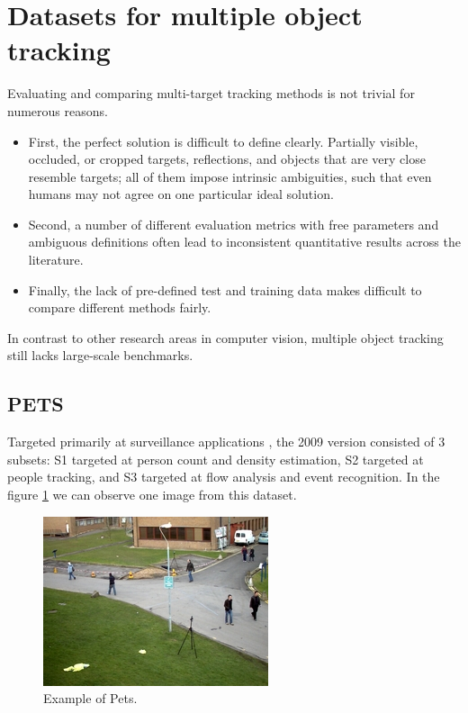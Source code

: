 \section{Datasets for multiple object tracking}\label{datasetracks}

Evaluating and comparing multi-target tracking methods is not trivial for numerous reasons. 

\begin{itemize}

\item First, the perfect solution is difficult to define clearly. Partially visible, occluded, or cropped targets, reflections, and objects that are very close resemble targets; all of them impose intrinsic ambiguities, such that even humans may not agree on one particular ideal solution.

\item Second, a number of different evaluation metrics with free parameters and ambiguous definitions often lead to inconsistent quantitative results across the literature.

\item Finally, the lack of pre-defined test and training data makes difficult to compare different methods fairly.

\end{itemize}


In contrast to other research areas in computer vision, multiple object tracking still lacks large-scale benchmarks.

\subsection{PETS}

Targeted primarily at surveillance applications \cite{pets}, the 2009 version consisted of 3 subsets: S1 targeted at person count and density estimation, S2 targeted at people tracking, and S3 targeted at flow analysis and event recognition. In the figure \ref{petsExample} we can observe one image from this dataset.

\begin{figure}[H]
\centering         
\includegraphics[width=0.5\linewidth]{datasetTracking/View_001.jpg}
\caption{Example of Pets.} \label{petsExample}
\end{figure}

